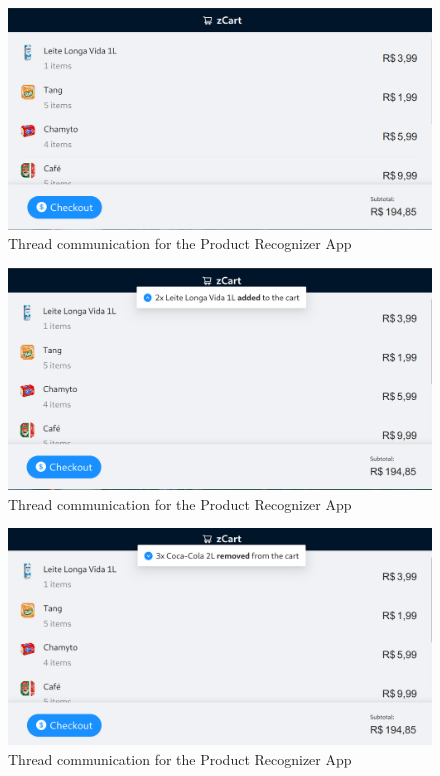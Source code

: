 \documentclass[openright]{normas-utf-tex} %
\begin{document}
\begin{figure}[H]
	\centering
	\includegraphics[width=1\textwidth]{./images/userapp.png}
	\caption[]{Thread communication for the Product Recognizer App}
\end{figure}

\begin{figure}[H]
	\centering
	\includegraphics[width=1\textwidth]{./images/userapp2.png}
	\caption[]{Thread communication for the Product Recognizer App}
\end{figure}

\begin{figure}[H]
	\centering
	\includegraphics[width=1\textwidth]{./images/userapp3.png}
	\caption[]{Thread communication for the Product Recognizer App}
\end{figure}
\end{document}
